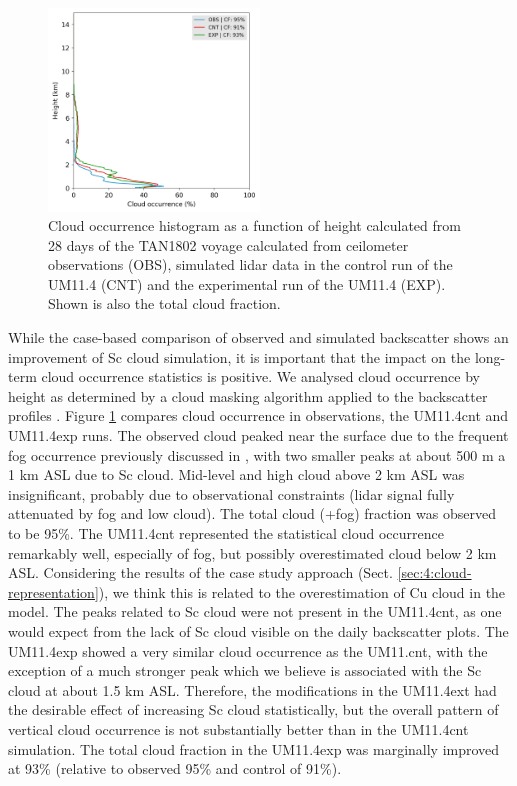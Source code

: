 \begin{figure}[t]
\centering
\includegraphics[width=0.5\textwidth]{chapter4/fig/cloud_occurrence.png}
\caption[Cloud occurrence histogram as a function of height]{
Cloud occurrence histogram as a function of height calculated from
28 days of the TAN1802 voyage calculated from ceilometer observations (OBS),
simulated lidar data in the control run of the UM11.4 (CNT) and
the experimental run of the UM11.4 (EXP).
Shown is also the total cloud fraction.
}
\label{fig:4:cloud-occurrence}
\end{figure}

While the case-based comparison of observed and simulated backscatter
shows an improvement of Sc cloud simulation, it is important that the impact
on the long-term cloud occurrence statistics is positive. We analysed
cloud occurrence by height as determined by a cloud masking algorithm
applied to the backscatter profiles \citep{kuma2020b}.
Figure \ref{fig:4:cloud-occurrence} compares cloud occurrence in observations,
the UM11.4cnt and UM11.4exp runs. The observed cloud peaked near the surface due to
the frequent fog occurrence previously discussed in \cite{kuma2020a},
with two smaller peaks at about 500 m a 1 km ASL due to Sc cloud.
Mid-level and high cloud above 2 km ASL was insignificant, probably due
to observational constraints (lidar signal fully attenuated by fog and low
cloud). The total cloud (+fog) fraction was observed to be 95\%.
The UM11.4cnt represented the statistical cloud occurrence remarkably well,
especially of fog, but possibly overestimated cloud below 2 km ASL. Considering
the results of the case study approach (Sect. \ref{sec:4:cloud-representation}), we think this is related to the
overestimation of Cu cloud in the model. The peaks related to Sc cloud were not present in the UM11.4cnt, as one would expect from the lack of Sc cloud
visible on the daily backscatter plots. The UM11.4exp showed a very similar
cloud occurrence as the UM11.cnt, with the exception of a much stronger peak which we believe is  associated with the Sc cloud at about 1.5 km ASL. Therefore, the modifications
in the UM11.4ext had the desirable effect of increasing Sc cloud statistically,
but the overall pattern of vertical cloud occurrence is not substantially better
than in the UM11.4cnt simulation. The total cloud fraction in the UM11.4exp was marginally
improved at 93\% (relative to observed 95\% and control of 91\%).

